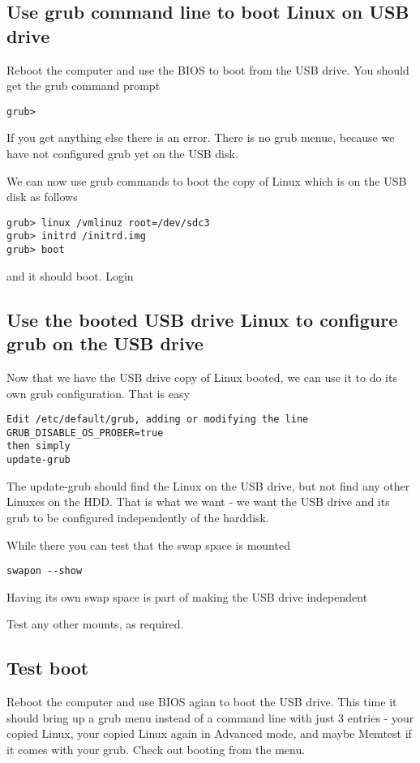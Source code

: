 \documentclass{article}  %
\begin{document}
\subsection{Use grub command line to boot Linux on USB drive}
Reboot the computer and use the BIOS to boot from the USB drive. You should get the grub command prompt
\begin{verbatim}
grub>
\end{verbatim}
If you get anything else there is an error.
There is no grub menue, because we have not configured grub yet on the USB disk.

We can now use grub commands to boot the copy of Linux which is on the USB disk as follows
\begin{verbatim}
grub> linux /vmlinuz root=/dev/sdc3
grub> initrd /initrd.img
grub> boot
\end{verbatim}
and it should boot. Login

\subsection{Use the booted USB drive Linux to configure grub on the USB drive}
Now that we have the USB drive copy of Linux booted, we can use it to do its own grub configuration.
That is easy
\begin{verbatim}
Edit /etc/default/grub, adding or modifying the line
GRUB_DISABLE_OS_PROBER=true
then simply
update-grub
\end{verbatim}
The update-grub should find the Linux on the USB drive, but not find any other Linuxes on the HDD. That is what we want - we want the USB drive and its grub to be configured independently of the harddisk.

While there you can test that the swap space is mounted
\begin{verbatim}
swapon --show
\end{verbatim}
Having its own swap space is part of making the USB drive independent

Test any other mounts, as required.

\subsection{Test boot}
Reboot the computer and use BIOS agian to boot the USB drive. This time it should bring up a grub menu instead of a command line with just 3 entries - your copied Linux, your copied Linux again in Advanced mode, and maybe Memtest if it comes with your grub.
Check out booting from the menu.
\end{document}
